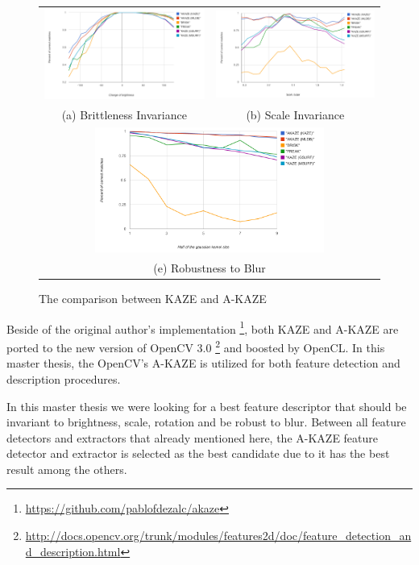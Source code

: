\begin{figure}[H]
\begin{tabular}{cc}
  \includegraphics[width=75mm]{figures/brithness_akaze} &  \includegraphics[width=75mm]{figures/scale_akaze} \\
(a) Brittleness Invariance & (b) Scale Invariance \\[6pt]
\multicolumn{2}{c}{\includegraphics[width=75mm]{figures/blur_akaze} }\\
\multicolumn{2}{c}{(e) Robustness to Blur}
\end{tabular}
\caption{The comparison between KAZE and A-KAZE}\label{fig:compare_kaze_and_A-kaze}
\end{figure}

Beside of the original author's implementation \footnote{\url{https://github.com/pablofdezalc/akaze}}, both KAZE and A-KAZE are ported to the new version of OpenCV 3.0  \footnote{\url{http://docs.opencv.org/trunk/modules/features2d/doc/feature_detection_and_description.html}} and boosted by OpenCL. In this master thesis, the OpenCV's A-KAZE is utilized for both feature detection and description procedures. 

In this master thesis we were looking for a best feature descriptor that should be invariant to brightness, scale, rotation and be robust to blur. Between all feature detectors and extractors that already mentioned here, the A-KAZE feature detector and extractor is selected as the best candidate due to it has the best result among the others.

